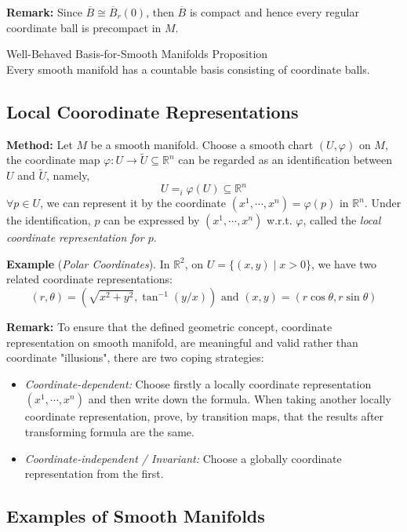 \noindent\textbf{Remark:} Since $\overline{B} \cong \overline{B}_r(0)$, then $\overline{B}$ is compact and hence every regular coordinate ball is precompact in $M$.

\begin{proposition}{Well-Behaved Basis-for-Smooth Manifolds Proposition}\\
Every smooth manifold has a countable basis consisting of coordinate balls.
\end{proposition}

\subsection{Local Coorodinate Representations}

\noindent\textbf{Method:} Let $M$ be a smooth manifold. Choose a smooth chart $(U,\varphi)$ on $M$, the coordinate map $\varphi:U\to \tilde{U} \subseteq \mathbb{R}^n$ can be regarded as an identification between $U$ and $\tilde{U}$, namely,
\[
U=_i \varphi(U) \subseteq \mathbb{R}^n
\]
$\forall p\in U$, we can represent it by the coordinate $(x^1 ,\cdots, x^n)= \varphi(p)$ in $\mathbb{R}^n$. Under the identification, $p$ can be expressed by $(x^1,\cdots, x^n)$ w.r.t. $\varphi$, called the \textit{local coordinate representation for $p$}.

\noindent\textbf{Example} (\textit{Polar Coordinates}). In $\mathbb{R}^2$, on $U=\{ (x,y) \mid x>0\}$, we have two related coordinate representations:
\[
(r,\theta)= (\sqrt{x^2+y^2}, \tan^{-1} (y/x)) \text{ and } (x,y)= (r\cos \theta, r\sin \theta)
\]

\noindent\textbf{Remark:} To ensure that the defined geometric concept, coordinate representation on smooth manifold, are meaningful and valid rather than coordinate "illusions", there are two coping strategies:
\begin{itemize}
    \item \textit{Coordinate-dependent:} Choose firstly a locally coordinate representation $(x^1 ,\cdots, x^n)$ and then write down the formula. When taking another locally coordinate representation, prove, by transition maps, that the results after transforming formula are the same.

    \item \textit{Coordinate-independent / Invariant:} Choose a globally coordinate representation from the first.
\end{itemize}

\subsection{Examples of Smooth Manifolds}

